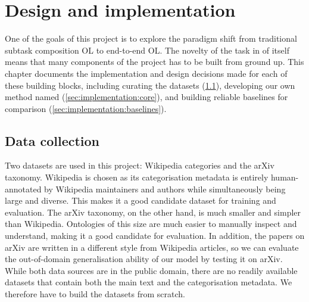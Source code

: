 \chapter{Design and implementation}

One of the goals of this project is to explore the paradigm shift from traditional subtask composition OL to end-to-end OL. The novelty of the task in of itself means that many components of the project has to be built from ground up. This chapter documents the implementation and design decisions made for each of these building blocks, including curating the datasets (\cref{sec:implementation:data-collection}), developing our own method named \textbf{\name} (\cref{sec:implementation:core}), and building reliable baselines for comparison (\cref{sec:implementation:baselines}).



\section{Data collection}  \label{sec:implementation:data-collection}

Two datasets are used in this project: Wikipedia categories and the arXiv taxonomy. Wikipedia is chosen as its categorisation metadata is entirely human-annotated by Wiki\-pedia maintainers and authors while simultaneously being large and diverse. This makes it a good candidate dataset for training and evaluation. The arXiv taxonomy, on the other hand, is much smaller and simpler than Wikipedia. Ontologies of this size are much easier to manually inspect and understand, making it a good candidate for evaluation. In addition, the papers on arXiv are written in a different style from Wikipedia articles, so we can evaluate the out-of-domain generalisation ability of our model by testing it on arXiv. While both data sources are in the public domain, there are no readily available datasets that contain both the main text and the categorisation metadata. We therefore have to build the datasets from scratch.


